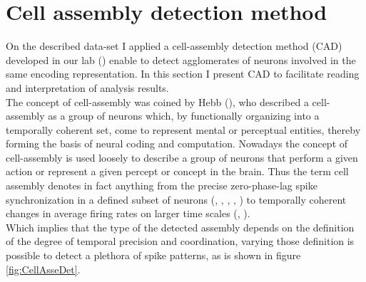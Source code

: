 \section{Cell assembly detection method}
\label{chap:AssemblyMethod}
\begin{framed}
On the described data-set I applied a cell-assembly detection method (CAD) developed in our lab (\cite{RussoDurstewitz}) enable to detect agglomerates of neurons involved in the same encoding representation. In this section I present CAD to facilitate reading and interpretation of analysis results.\\The concept of cell-assembly was coined by Hebb (\cite{Hebb}), who described a cell-assembly as a group of neurons which, by functionally organizing into a temporally coherent set, come to represent mental or perceptual entities, thereby forming the basis of neural coding and computation. Nowadays the concept of cell-assembly is used loosely to describe a group of neurons that perform a given action or represent a given percept or concept in the brain. Thus the term cell assembly denotes in fact anything from the precise zero-phase-lag spike synchronization in a defined subset of neurons (\cite{Abeles}, \cite{Singer}, \cite{Roelfsema}, \cite{Diesmann}, \cite{Harris2003}) to temporally coherent changes in average firing rates on larger time scales (\cite{Goldman}, \cite{Durstewitz}).\\Which implies that the type of the detected assembly depends on the definition of the degree of temporal precision and coordination, varying those definition is possible to detect a plethora of spike patterns, as is shown in figure \ref{fig:CellAsseDet}.
\begin{figure}[H]
    \centering

\end{figure}
\end{framed}
